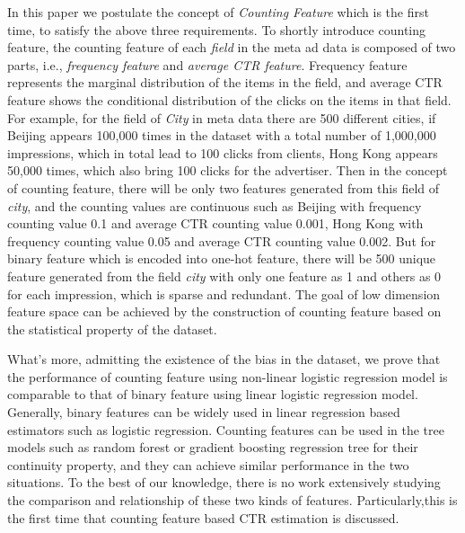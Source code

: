 In this paper we postulate the concept of \textit{Counting Feature} which is the first time, to satisfy the above three requirements. To shortly introduce counting feature, the counting feature of each \textit{field} in the meta ad data is composed of two parts, i.e., \textit{frequency feature} and \textit{average CTR feature}. Frequency feature represents the marginal distribution of the items in the field, and average CTR feature shows the conditional distribution of the clicks on the items in that field. For example, for the field of \textit{City} in meta data there are 500 different cities, if Beijing appears 100,000 times in the dataset with a total number of 1,000,000 impressions, which in total lead to 100 clicks from clients, Hong Kong appears 50,000 times, which also bring 100 clicks for the advertiser. Then in the concept of counting feature, there will be only two features generated from this field of \textit{city}, and the counting values are continuous such as Beijing with frequency counting value 0.1 and average CTR counting value 0.001, Hong Kong with frequency counting value 0.05 and average CTR counting value 0.002. But for binary feature which is encoded into one-hot feature, there will be 500 unique feature generated from the field \textit{city} with only one feature as 1 and others as 0 for each impression, which is sparse and redundant. The goal of low dimension feature space can be achieved by the construction of counting feature based on the statistical property of the dataset. 

What's more, admitting the existence of the bias in the dataset, we prove that the performance of counting feature using non-linear logistic regression model is comparable to that of binary feature using linear logistic regression model. Generally, binary features can be widely used in linear regression based estimators such as logistic regression. Counting features can be used in the tree models such as random forest or gradient boosting regression tree for their continuity property, and they can achieve similar performance in the two situations. To the best of our knowledge, there is no work extensively studying the comparison and relationship of these two kinds of features. Particularly,this is the first time that counting feature based CTR estimation is discussed.  

